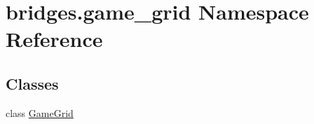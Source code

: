 \hypertarget{namespacebridges_1_1game__grid}{}\section{bridges.\+game\+\_\+grid Namespace Reference}
\label{namespacebridges_1_1game__grid}
\subsection*{Classes}
\begin{DoxyCompactItemize}
\item 
class \hyperlink{classbridges_1_1game__grid_1_1_game_grid}{Game\+Grid}
\end{DoxyCompactItemize}
